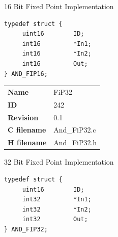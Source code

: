 16 Bit Fixed Point Implementation

\begin{lstlisting}
typedef struct {
     uint16        ID;
     int16         *In1;
     int16         *In2;
     int16         Out;
} AND_FIP16;
\end{lstlisting}

\ifdefined \AddTestReports
{}
\fi
{}
\nopagebreak[0]
\begin{tabular}{l l}
\textbf{Name} & FiP32 \tabularnewline
\textbf{ID} & 242 \tabularnewline
\textbf{Revision} & 0.1 \tabularnewline
\textbf{C filename} & And\_FiP32.c \tabularnewline
\textbf{H filename} & And\_FiP32.h \tabularnewline
\end{tabular}
\vspace{1ex}

32 Bit Fixed Point Implementation

\begin{lstlisting}
typedef struct {
     uint16        ID;
     int32         *In1;
     int32         *In2;
     int32         Out;
} AND_FIP32;
\end{lstlisting}

\ifdefined \AddTestReports
{}
\fi
